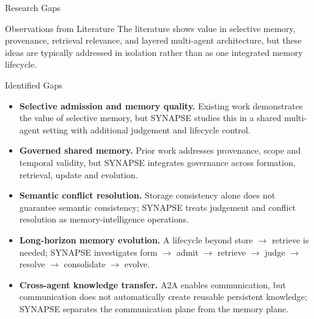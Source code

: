 \begin{frame}{Research Gaps}
\begin{block}{Observations from Literature}
The literature shows value in selective memory, provenance, retrieval relevance, and layered multi-agent architecture, but these ideas are typically addressed in isolation rather than as one integrated memory lifecycle.
\end{block}
\begin{alertblock}{Identified Gaps}
\begin{itemize}[leftmargin=1.5em,itemsep=4pt,topsep=4pt]
\item \textbf{Selective admission and memory quality.} Existing work demonstrates the value of selective memory, but SYNAPSE studies this in a shared multi-agent setting with additional judgement and lifecycle control.
\item \textbf{Governed shared memory.} Prior work addresses provenance, scope and temporal validity, but SYNAPSE integrates governance across formation, retrieval, update and evolution.
\item \textbf{Semantic conflict resolution.} Storage consistency alone does not guarantee semantic consistency; SYNAPSE treats judgement and conflict resolution as memory-intelligence operations.
\item \textbf{Long-horizon memory evolution.} A lifecycle beyond store $\rightarrow$ retrieve is needed; SYNAPSE investigates form $\rightarrow$ admit $\rightarrow$ retrieve $\rightarrow$ judge $\rightarrow$ resolve $\rightarrow$ consolidate $\rightarrow$ evolve.
\item \textbf{Cross-agent knowledge transfer.} A2A enables communication, but communication does not automatically create reusable persistent knowledge; SYNAPSE separates the communication plane from the memory plane.
\end{itemize}
\end{alertblock}
\end{frame}
